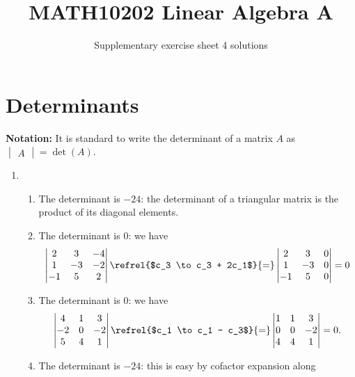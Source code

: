 \documentclass[english,12pt,a4paper]{scrartcl}
\title{MATH10202 Linear Algebra A}
\subtitle{Supplementary exercise sheet 4 solutions}
\author{}
\date{\vspace{-4.5ex}}
\begin{document}
\maketitle

\vspace{-5ex}

\section*{Determinants}
\textbf{Notation:} It is standard to write the determinant of a matrix $A$ as 
$\begin{vmatrix}A\end{vmatrix} = \det(A)$.

\begin{enumerate}
  \item %
    \begin{enumerate}
      \item The determinant is $-24$: the determinant of a triangular matrix is 
        the product of its diagonal elements.
      \item The determinant is $0$: we have
        \[
          \begin{vmatrix}
            2 & 3 & -4 \\
            1 & -3 & -2 \\
            -1 & 5 & 2
          \end{vmatrix}
          \refrel{$c_3 \to c_3 + 2c_1$}{=}
          \begin{vmatrix}
            2 & 3 & 0 \\
            1 & -3 & 0 \\
            -1 & 5 & 0
          \end{vmatrix}
          = 0
        \]
      \item The determinant is $0$: we have
        \[
          \begin{vmatrix}
            4 & 1 & 3 \\
            -2 & 0 & -2 \\
            5 & 4 & 1
          \end{vmatrix}
          \refrel{$c_1 \to c_1 - c_3$}{=}
          \begin{vmatrix}
            1 & 1 & 3 \\
            0 & 0 & -2 \\
            4 & 4 & 1
          \end{vmatrix}
          = 0.
        \]
      \item The determinant is $-24$: this is easy by cofactor expansion along 

\end{enumerate}
\end{enumerate}
\end{document}
